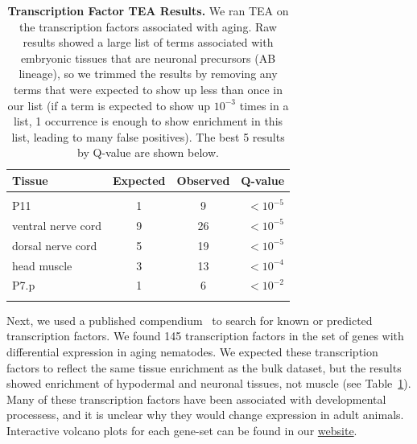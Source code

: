 \documentclass[10pt,letterpaper,twocolumn]{article}
\newcommand{\tfaging}{145}
\newcommand{\webref}{
\href{https://wormlabcaltech.github.io/Angeles_Leighton_2016/}{website}}
\newcommand{\ra}[1]{\renewcommand{\arraystretch}{#1}}
\begin{document}
\begin{table}
\renewcommand{\familydefault}{\sfdefault}\normalfont{}
\centering{}
\ra{1.3}
\caption{\textbf{Transcription Factor TEA Results.} We ran TEA on the transcription factors associated with aging. Raw results showed a large list of terms associated with embryonic tissues that are neuronal precursors (AB lineage), so we trimmed the results by removing any terms that were expected to show up less than once in our list (if a term is expected to show up $10^{-3}$ times in a list, 1 occurrence is enough to show enrichment in this list, leading to many false positives). The best 5 results by Q-value are shown below.}
\begin{tabular}{@{}lccr@{}}
\toprule{}
Tissue & Expected & Observed & Q-value\\
\bottomrule{}\\
P11 & 1 & 9 & $<10^{-5}$\\
ventral nerve cord &	9 &	26 &	$<10^{-5}$\\
dorsal nerve cord &	5 &	19 & $<10^{-5}$\\
head muscle & 3	& 13 &	$<10^{-4}$\\
P7.p & 1 &	6	& $<10^{-2}$\\
\bottomrule{}
\end{tabular}
\label{tab:tea_tf_age}
\end{table}

Next, we used a published compendium~\cite{Reece-Hoyes2005} to search for known or predicted transcription factors. We found \tfaging{} transcription factors in the set of genes with differential expression in aging nematodes. We expected these transcription factors to reflect the same tissue enrichment as the bulk dataset, but the results showed enrichment of hypodermal and neuronal tissues, not muscle (see Table~\ref{tab:tea_tf_age}). Many of these transcription factors have been  associated with developmental processess, and it is unclear why they would change expression in adult animals. Interactive volcano plots for each gene-set can be found in our \webref{}.
\end{document}
